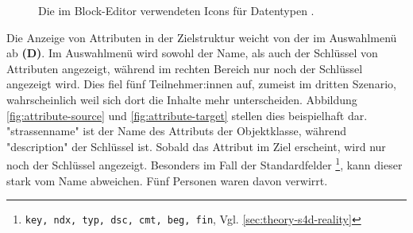 \begin{figure}
  \centering
  \caption{Die im Block-Editor verwendeten Icons für Datentypen .}
  \label{fig:icons}
\end{figure}

Die Anzeige von Attributen in der Zielstruktur weicht von der im Auswahlmenü ab \textbf{(D)}. Im Auswahlmenü wird sowohl der Name, als auch der Schlüssel von Attributen angezeigt, während im rechten Bereich nur noch der Schlüssel angezeigt wird. Dies fiel fünf Teilnehmer:innen auf, zumeist im dritten Szenario, wahrscheinlich weil sich dort die Inhalte mehr unterscheiden. Abbildung \ref{fig:attribute-source} und \ref{fig:attribute-target} stellen dies beispielhaft dar. "strassenname" ist der Name des Attributs der Objektklasse, während "description" der Schlüssel ist. Sobald das Attribut im Ziel erscheint, wird nur noch der Schlüssel angezeigt. Besonders im Fall der Standardfelder \footnote{\texttt{key, ndx, typ, dsc, cmt, beg, fin}, Vgl. \ref{sec:theory-s4d-reality}}, kann dieser stark vom Name abweichen. Fünf Personen waren davon verwirrt.

